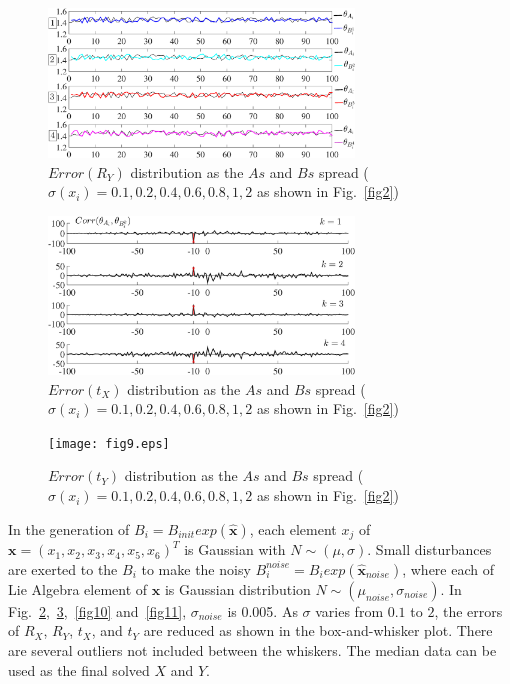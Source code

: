 \documentclass[letterpaper, 10 pt, conference]{ieeeconf}  %
\begin{document}
\begin{center}
\begin{figure}
\centering
\includegraphics[width=3.2in]{fig7.eps}
\caption{
$Error(R_Y)$ distribution as the $As$ and $Bs$ spread ($\sigma(x_i) = 0.1, 0.2, 0.4, 0.6, 0.8, 1, 2$ as shown in Fig.~\ref{fig2})
}
\label{fig7}
\end{figure}
\end{center}

\begin{center}
\begin{figure}
\centering
\includegraphics[width=3.2in]{fig8.eps}
\caption{
$Error(t_X)$ distribution as the $As$ and $Bs$ spread ($\sigma(x_i) = 0.1, 0.2, 0.4, 0.6, 0.8, 1, 2$ as shown in Fig.~\ref{fig2})
}
\label{fig8}
\end{figure}
\end{center}

\begin{center}
\begin{figure}
\centering
\texttt{[image: fig9.eps]}
\caption{
$Error(t_Y)$ distribution as the $As$ and $Bs$ spread ($\sigma(x_i) = 0.1, 0.2, 0.4, 0.6, 0.8, 1, 2$ as shown in Fig.~\ref{fig2})
}
\label{fig9}
\end{figure}
\end{center}


In the generation of $B_i = B_{init} exp(\mathbf{\widehat{x}})$, each element $x_j$ of $\mathbf{x} = (x_1,x_2,x_3,x_4,x_5,x_6)^T $ is Gaussian with $N \sim (\mu,\sigma)$. Small disturbances are exerted to the $B_i$ to make the noisy $B_i^{noise} = B_i exp(\mathbf{\widehat{x}}_{noise})$, where each of Lie Algebra element of $\mathbf{x}$ is Gaussian distribution $N \sim (\mu_{noise},\sigma_{noise})$. In Fig.~\ref{fig8},~\ref{fig9},~\ref{fig10} and~\ref{fig11}, $\sigma_{noise}$ is 0.005. As $\sigma$ varies from $0.1$ to $2$, the errors of $R_X$, $R_Y$, $t_X$, and $t_Y$ are reduced as shown in the box-and-whisker plot. There are several outliers not included between the whiskers. The median data can be used as the final solved $X$ and $Y$.
\end{document}

